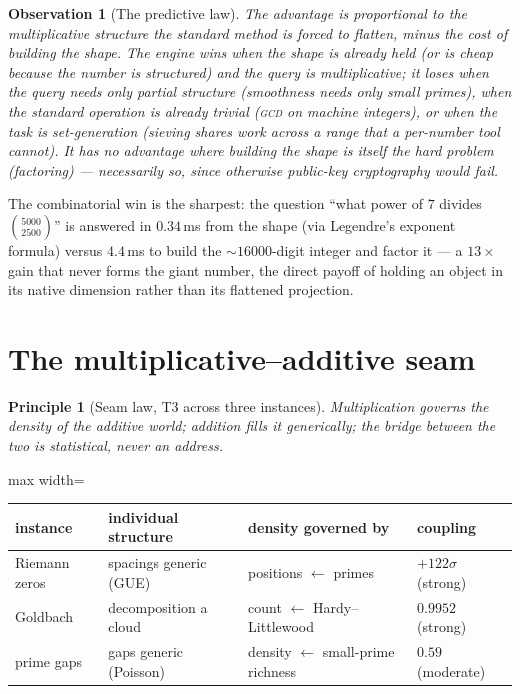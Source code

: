 \documentclass[11pt]{article}
\newtheorem{observation}{Observation}
\newtheorem{principle}{Principle}
\begin{document}
\begin{observation}[The predictive law]
The advantage is proportional to the multiplicative structure the standard method is forced to flatten,
minus the cost of building the shape. The engine wins when the shape is already held (or is cheap because
the number is structured) and the query is multiplicative; it loses when the query needs only partial
structure (smoothness needs only small primes), when the standard operation is already trivial
(\textsc{gcd} on machine integers), or when the task is set-generation (sieving shares work across a range
that a per-number tool cannot). It has no advantage where building the shape is itself the hard problem
(factoring) --- necessarily so, since otherwise public-key cryptography would fail.
\end{observation}

The combinatorial win is the sharpest: the question ``what power of $7$ divides $\binom{5000}{2500}$'' is
answered in $0.34$\,ms from the shape (via Legendre's exponent formula) versus $4.4$\,ms to build the
$\sim\!16000$-digit integer and factor it --- a $13\times$ gain that never forms the giant number, the direct
payoff of holding an object in its native dimension rather than its flattened projection.

\section{The multiplicative--additive seam}

\begin{principle}[Seam law, T3 across three instances]
Multiplication governs the \emph{density} of the additive world; addition fills it generically; the bridge
between the two is statistical, never an address.
\end{principle}

\begin{center}
\begin{adjustbox}{max width=\linewidth}\begin{tabular}{llll}
\toprule
instance & individual structure & density governed by & coupling \\
\midrule
Riemann zeros & spacings generic (GUE) & positions $\leftarrow$ primes & $+122\sigma$ (strong) \\
Goldbach & decomposition a cloud & count $\leftarrow$ Hardy--Littlewood & $0.9952$ (strong) \\
prime gaps & gaps generic (Poisson) & density $\leftarrow$ small-prime richness & $0.59$ (moderate) \\
\bottomrule
\end{tabular}\end{adjustbox}
\end{center}
\end{document}
